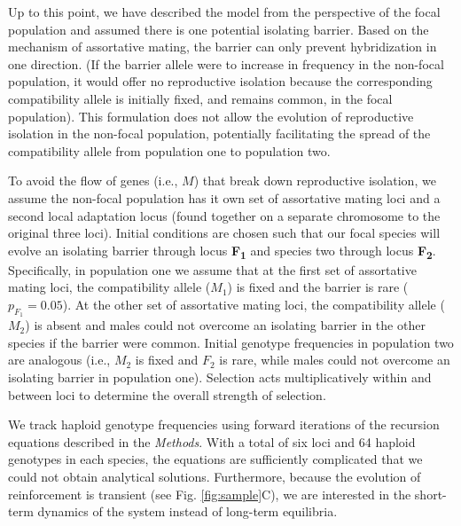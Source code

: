 \documentclass[11pt]{article}
\begin{document}
Up to this point, we have described the model from the perspective of the focal population and assumed there is one potential isolating barrier. Based on the mechanism of assortative mating, the barrier can only prevent hybridization in one direction. (If the barrier allele were to increase in frequency in the non-focal population, it would offer no reproductive isolation because the corresponding compatibility allele is initially fixed, and remains common, in the focal population). This formulation does not allow the evolution of reproductive isolation in the non-focal population, potentially facilitating the spread of the compatibility allele from population one to population two. 

To avoid the flow of genes (i.e., $M$) that break down reproductive isolation, we assume the non-focal population has it own set of assortative mating loci and a second local adaptation locus (found together on a separate chromosome to the original three loci). Initial conditions are chosen such that our focal species will evolve an isolating barrier through locus \textbf{\texorpdfstring{F\textsubscript{1}}{F 1}} and species two through locus \textbf{\texorpdfstring{F\textsubscript{2}}{F 2}}. Specifically, in population one we assume that at the first set of assortative mating loci, the compatibility allele ($M_1$) is fixed and the barrier is rare ($p_{F_1} = 0.05$). At the other set of assortative mating loci, the compatibility allele ($M_2$) is absent and males could not overcome an isolating barrier in the other species if the barrier were common.  Initial genotype frequencies in population two are analogous (i.e., $M_2$ is fixed and $F_2$ is rare, while males could not overcome an isolating barrier in population one). Selection acts multiplicatively within and between loci to determine the overall strength of selection.  

We track haploid genotype frequencies using forward iterations of the recursion equations described in the \emph{Methods}.  With a total of six loci and 64 haploid genotypes in each species, the equations are sufficiently complicated that we could not obtain analytical solutions.  Furthermore, because the evolution of reinforcement is transient (see Fig. \ref{fig:sample}C), we are interested in the short-term dynamics of the system instead of long-term equilibria.  
\end{document}
